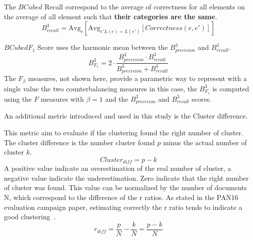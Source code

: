 \begin{definition}
  The $BCubed$ Recall correspond to the average of correctness for all elements on the average of all element such that \textbf{their categories are the same}.
  \begin{equation}
    B^3_{recall} = \text{Avg}_{e}[\text{Avg}_{e' L(e)=L(e')}[Correctness(e, e')]]
  \end{equation}
\end{definition}

\begin{definition}
  $BCubed F_1$ Score uses the harmonic mean between the $B^3_{precision}$ and $B^3_{recall}$.
  \begin{equation}
    B^3_{F_1} =
    2 \cdot \frac{B^3_{precision} \cdot B^3_{recall}}
    {B^3_{precision} + B^3_{recall}}
  \end{equation}
  The $F_\beta$ measures, not shown here, provide a parametric way to represent with a single value the two counterbalancing measures in this case, the $B^3_{F_1}$ is computed using the $F$ measures with $\beta = 1$ and the $B^3_{precision}$ and $B^3_{recall}$ scores.
\end{definition}

An additional metric introduced and used in this study is the Cluster difference.

\begin{definition}
  This metric aim to evaluate if the clustering found the right number of cluster.
  The cluster difference is the number cluster found $p$ minus the actual number of cluster $k$.
  \begin{equation}
    Cluster_{diff} = p - k
  \end{equation}
  A positive value indicate an overestimation of the real number of cluster, a negative value indicate the underestimation.
  Zero indicate that the right number of cluster was found.
  This value can be normalized by the number of documents N, which correspond to the difference of the r ratios.
  As stated in the PAN16 evaluation campaign paper, estimating correctly the r ratio tends to indicate a good clustering~\cite{pan16}.
  \begin{equation}
    r_{diff} = \frac{p}{N} - \frac{k}{N} = \frac{p - k}{N}
  \end{equation}
\end{definition}
